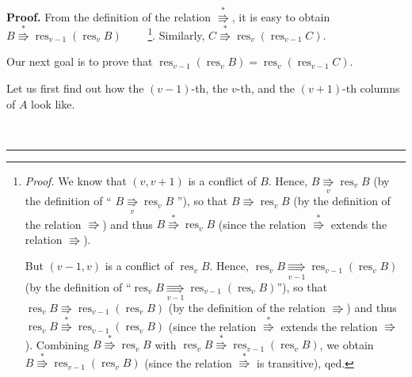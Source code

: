 \documentclass[numbers=enddot,12pt,final,onecolumn,notitlepage]{scrartcl}%
\theoremstyle{definition}
\newenvironment{proof}[1][Proof]{\noindent\textbf{#1.} }{\ \rule{0.5em}{0.5em}}
\newenvironment{verlong}{}{}
\begin{document}
\begin{verlong}
\begin{proof}
From the definition of the relation $\overset{\ast}{\Rrightarrow}$, it is easy
to obtain $B\overset{\ast}{\Rrightarrow}\operatorname*{res}\nolimits_{v-1}%
\left(  \operatorname*{res}\nolimits_{v}B\right)  $%
\ \ \ \ \footnote{\textit{Proof.} We know that $\left(  v,v+1\right)  $ is a
conflict of $B$. Hence, $B\underset{v}{\Rrightarrow}\operatorname*{res}%
\nolimits_{v}B$ (by the definition of \textquotedblleft%
$B\underset{v}{\Rrightarrow}\operatorname*{res}\nolimits_{v}B$%
\textquotedblright), so that $B\Rrightarrow\operatorname*{res}\nolimits_{v}B$
(by the definition of the relation $\Rrightarrow$) and thus $B\overset{\ast
}{\Rrightarrow}\operatorname*{res}\nolimits_{v}B$ (since the relation
$\overset{\ast}{\Rrightarrow}$ extends the relation $\Rrightarrow$).
\par
But $\left(  v-1,v\right)  $ is a conflict of $\operatorname*{res}%
\nolimits_{v}B$. Hence, $\operatorname*{res}\nolimits_{v}%
B\underset{v-1}{\Rrightarrow}\operatorname*{res}\nolimits_{v-1}\left(
\operatorname*{res}\nolimits_{v}B\right)  $ (by the definition of
\textquotedblleft$\operatorname*{res}\nolimits_{v}B\underset{v-1}{\Rrightarrow
}\operatorname*{res}\nolimits_{v-1}\left(  \operatorname*{res}\nolimits_{v}%
B\right)  $\textquotedblright), so that $\operatorname*{res}\nolimits_{v}%
B\Rrightarrow\operatorname*{res}\nolimits_{v-1}\left(  \operatorname*{res}%
\nolimits_{v}B\right)  $ (by the definition of the relation $\Rrightarrow$)
and thus $\operatorname*{res}\nolimits_{v}B\overset{\ast}{\Rrightarrow
}\operatorname*{res}\nolimits_{v-1}\left(  \operatorname*{res}\nolimits_{v}%
B\right)  $ (since the relation $\overset{\ast}{\Rrightarrow}$ extends the
relation $\Rrightarrow$). Combining $B\overset{\ast}{\Rrightarrow
}\operatorname*{res}\nolimits_{v}B$ with $\operatorname*{res}\nolimits_{v}%
B\overset{\ast}{\Rrightarrow}\operatorname*{res}\nolimits_{v-1}\left(
\operatorname*{res}\nolimits_{v}B\right)  $, we obtain $B\overset{\ast
}{\Rrightarrow}\operatorname*{res}\nolimits_{v-1}\left(  \operatorname*{res}%
\nolimits_{v}B\right)  $ (since the relation $\overset{\ast}{\Rrightarrow}$ is
transitive), qed.}. Similarly, $C\overset{\ast}{\Rrightarrow}%
\operatorname*{res}\nolimits_{v}\left(  \operatorname*{res}\nolimits_{v-1}%
C\right)  $.

Our next goal is to prove that $\operatorname*{res}\nolimits_{v-1}\left(
\operatorname*{res}\nolimits_{v}B\right)  =\operatorname*{res}\nolimits_{v}%
\left(  \operatorname*{res}\nolimits_{v-1}C\right)  $.

Let us first find out how the $\left(  v-1\right)  $-th, the $v$-th, and the
$\left(  v+1\right)  $-th columns of $A$ look like.


\end{proof}
\end{verlong}
\end{document}
